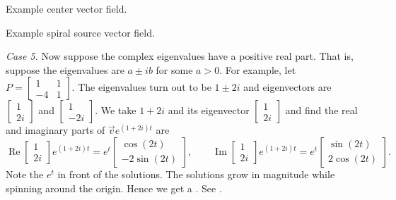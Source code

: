 \begin{myfig}
\parbox[t]{3.0in}{
 \capstart
 \caption{Example center vector field.\label{pln:ellipsesfig}}
}
\quad
\parbox[t]{3.0in}{
 \capstart
 \caption{Example spiral source vector field.\label{pln:spiral-sourcefig}}
}
\end{myfig}

\medskip

\emph{Case 5.} Now suppose the complex eigenvalues have a positive real
part.  That is, suppose the eigenvalues are $a \pm ib$ for some $a > 0$.
For example, let $P = 
\left[ \begin{smallmatrix} 1 & 1 \\ -4 & 1 \end{smallmatrix} \right]$.
The eigenvalues turn out to be $1\pm 2i$ and eigenvectors are
$\left[ \begin{smallmatrix} 1 \\ 2i \end{smallmatrix} \right]$ and
$\left[ \begin{smallmatrix} 1 \\ -2i \end{smallmatrix} \right]$.  We take
$1 + 2i$ and its eigenvector
$\left[ \begin{smallmatrix} 1 \\ 2i \end{smallmatrix} \right]$ and find
the real and imaginary parts of
$\vec{v} e^{(1+2i)t}$ are
\begin{equation*}
\operatorname{Re}
\begin{bmatrix} 1 \\ 2i \end{bmatrix} e^{(1+2i)t} =
e^t
\begin{bmatrix} \cos (2t) \\ -2 \sin (2t)  \end{bmatrix} ,
\qquad
\operatorname{Im}
\begin{bmatrix} 1 \\ 2i \end{bmatrix} e^{(1+2i)t} =
e^t
\begin{bmatrix} \sin (2t) \\ 2 \cos (2t) \end{bmatrix} .
\end{equation*}
Note the $e^t$ in front of the solutions.  The solutions
grow in magnitude while spinning around the origin.  Hence we get
a \emph{}.
See .

